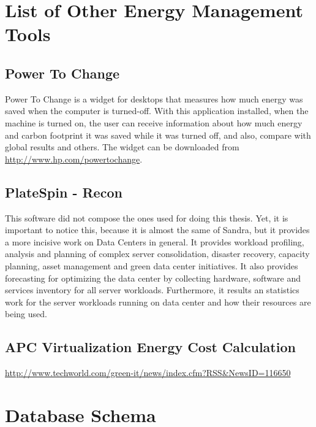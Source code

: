 \chapter{List of Other Energy Management Tools} \label{app:list_other_energy_management_tools}
    \section{Power To Change} \label{app:power_to_change}
    Power To Change is a widget for desktops that measures how much energy was saved when the computer is turned-off. With this application installed, when the machine is turned on, the user can receive information about how much energy and carbon footprint it was saved while it was turned off, and also, compare with global results and others.
    The widget can be downloaded from \url{http://www.hp.com/powertochange}.

    \section{PlateSpin - Recon} \label{app:power_recon}
    This software did not compose the ones used for doing this thesis. Yet, it is important to notice this, because it is almost the same of Sandra, but it provides a more incisive work on Data Centers in general. It provides workload profiling, analysis and planning of complex server consolidation, disaster recovery, capacity planning, asset management and green data center initiatives. It also provides forecasting for optimizing the data center by collecting hardware, software and services inventory for all server workloads. Furthermore, it results an statistics work for the server workloads running on data center and how their resources are being used.
    
    \section{APC Virtualization Energy Cost Calculation}\label{app:apc_virtualization_energy_cost_calculation}
        \url{http://www.techworld.com/green-it/news/index.cfm?RSS&NewsID=116650}
    
\chapter{Database Schema} \label{app:database_schema}

